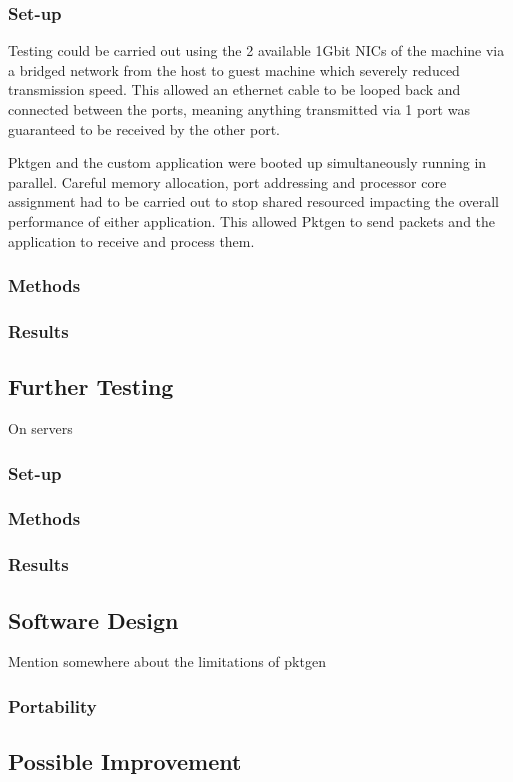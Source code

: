 \documentclass[final_report.tex]{subfiles}
\begin{document}
\subsubsection{Set-up}
Testing could be carried out using the 2 available 1Gbit NICs of the machine via a bridged network from the host to guest machine which severely reduced transmission speed. This allowed an ethernet cable to be looped back and connected between the ports, meaning anything transmitted via 1 port was guaranteed to be received by the other port.

Pktgen and the custom application were booted up simultaneously running in parallel. Careful memory allocation, port addressing and processor core assignment had to be carried out to stop shared resourced impacting the overall performance of either application. This allowed Pktgen to send packets and the application to receive and process them.

\subsubsection{Methods}

\subsubsection{Results}

\subsection{Further Testing}
On servers

\subsubsection{Set-up}

\subsubsection{Methods}

\subsubsection{Results}

\subsection{Software Design}
Mention somewhere about the limitations of pktgen

\subsubsection{Portability}

\subsection{Possible Improvement}
\end{document}
